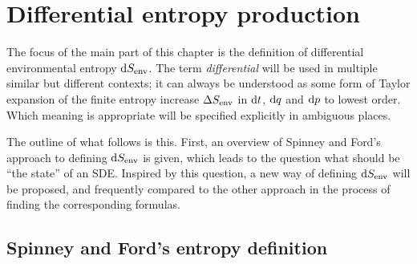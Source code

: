 \section{Differential entropy production}
\label{sec:differential entropy production}

The focus of the main part of this chapter is the definition of differential environmental entropy \(\mathrm{d}S_\text{env}\). The term \emph{differential} will be used in multiple similar but different contexts; it can always be understood as some form of Taylor expansion of the finite entropy increase \(\Delta S_\text{env}\) in \(\mathrm{d} t\), \(\mathrm{d} q\) and \(\mathrm{d} p\) to lowest order. Which meaning is appropriate will be specified explicitly in ambiguous places.

The outline of what follows is this. First, an overview of Spinney and Ford's approach to defining \(\mathrm{d}S_\text{env}\) is given, which leads to the question what should be ``the state'' of an SDE. Inspired by this question, a new way of defining \(\mathrm{d}S_\text{env}\) will be proposed, and frequently compared to the other approach in the process of finding the corresponding formulas.



\subsection{Spinney and Ford's entropy definition}


